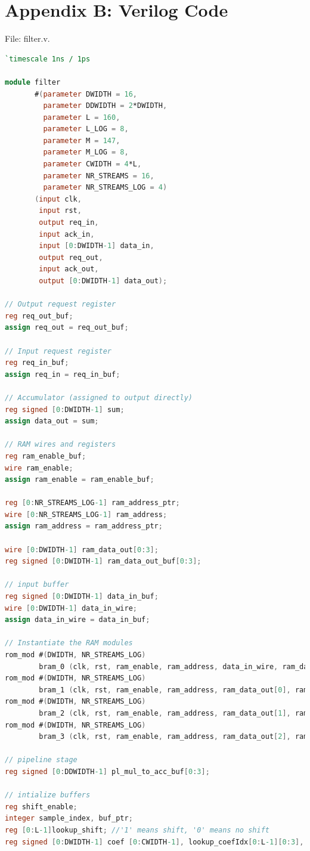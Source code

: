 \documentclass[a4paper,twoside,11pt, fleqn]{article}
\begin{document}
\section{Appendix B: Verilog Code}
File: filter.v.
\begin{lstlisting}[language=Verilog]
`timescale 1ns / 1ps

module filter
       #(parameter DWIDTH = 16,
         parameter DDWIDTH = 2*DWIDTH,
         parameter L = 160,
         parameter L_LOG = 8,
         parameter M = 147,
         parameter M_LOG = 8,
         parameter CWIDTH = 4*L,
         parameter NR_STREAMS = 16,
         parameter NR_STREAMS_LOG = 4)
       (input clk,
        input rst,
        output req_in,
        input ack_in,
        input [0:DWIDTH-1] data_in,
        output req_out,
        input ack_out,
        output [0:DWIDTH-1] data_out);

// Output request register
reg req_out_buf;
assign req_out = req_out_buf;

// Input request register
reg req_in_buf;
assign req_in = req_in_buf;

// Accumulator (assigned to output directly)
reg signed [0:DWIDTH-1] sum;
assign data_out = sum;

// RAM wires and registers
reg ram_enable_buf;
wire ram_enable;
assign ram_enable = ram_enable_buf;

reg [0:NR_STREAMS_LOG-1] ram_address_ptr;
wire [0:NR_STREAMS_LOG-1] ram_address;
assign ram_address = ram_address_ptr;

wire [0:DWIDTH-1] ram_data_out[0:3];
reg signed [0:DWIDTH-1] ram_data_out_buf[0:3];

// input buffer
reg signed [0:DWIDTH-1] data_in_buf;
wire [0:DWIDTH-1] data_in_wire;
assign data_in_wire = data_in_buf;

// Instantiate the RAM modules
rom_mod #(DWIDTH, NR_STREAMS_LOG)
        bram_0 (clk, rst, ram_enable, ram_address, data_in_wire, ram_data_out[0]);
rom_mod #(DWIDTH, NR_STREAMS_LOG)
        bram_1 (clk, rst, ram_enable, ram_address, ram_data_out[0], ram_data_out[1]);
rom_mod #(DWIDTH, NR_STREAMS_LOG)
        bram_2 (clk, rst, ram_enable, ram_address, ram_data_out[1], ram_data_out[2]);
rom_mod #(DWIDTH, NR_STREAMS_LOG)
        bram_3 (clk, rst, ram_enable, ram_address, ram_data_out[2], ram_data_out[3]);

// pipeline stage
reg signed [0:DDWIDTH-1] pl_mul_to_acc_buf[0:3];

// intialize buffers
reg shift_enable;
integer sample_index, buf_ptr;
reg [0:L-1]lookup_shift; //'1' means shift, '0' means no shift
reg signed [0:DWIDTH-1] coef [0:CWIDTH-1], lookup_coefIdx[0:L-1][0:3], coef_preproc[0:3];


\end{lstlisting}
\end{document}
